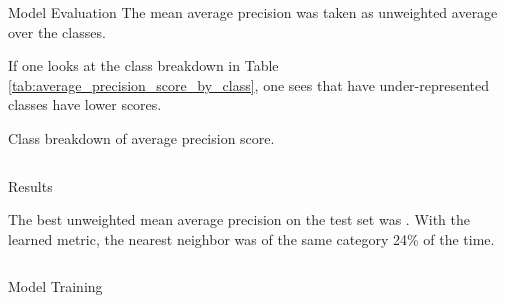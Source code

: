 \documentclass[final]{beamer}
\newlength{\onecolwid}
\newlength{\twocolwid}
\begin{document}
\begin{frame}[t]
\begin{columns}[t]
\begin{column}{\twocolwid}
\begin{columns}[t,totalwidth=\twocolwid]
\begin{column}{\onecolwid}
\begin{block}{Model Evaluation}
  The mean average precision was
   taken as
  unweighted average over the classes.

  If one looks at the class breakdown in Table
  \ref{tab:average_precision_score_by_class}, one sees that have
  under-represented classes have lower scores.
  \begin{table}
    \centering
    \scriptsize{}
    \caption{Class breakdown of average precision score.}
    \label{tab:average_precision_score_by_class}
  \end{table}
  
\end{block}


\end{column} %

\end{columns} %


\begin{alertblock}{Results}

  The best unweighted mean average precision on the test set was
  . With the
  learned metric, the nearest neighbor was of the same category 24\% of the
  time.
\end{alertblock} 


\begin{columns}[t,totalwidth=\twocolwid] %

  \begin{column}{\onecolwid} %
    
    \begin{block}{Model Training}


\end{block}
\end{column}
\end{columns}
\end{column}
\end{columns}
\end{frame}
\end{document}
